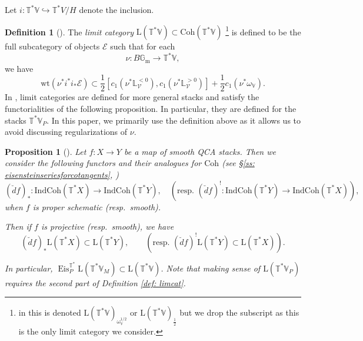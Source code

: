 \documentclass{amsart}
\newtheorem{proposition}[theorem]{Proposition}
\theoremstyle{definition}
\newtheorem{definition}[theorem]{Definition}
\theoremstyle{remark}
\numberwithin{equation}{section}
\newcommand{\mc}{\mathcal}
\newcommand{\Gm}{{\mathbb{G}_{\mathrm{m}}}}
\newcommand{\IndCoh}{\mathrm{IndCoh}}
\DeclareMathOperator{\Eis}{\mathrm{Eis}}
\newcommand{\Coh}{\mathrm{Coh}}
\newcommand{\V}{\mathbb{V}}
\newcommand{\T}{\mathbb{T}}
\renewcommand{\L}{\mathbb{L}}
\newcommand{\wt}{\mathrm{wt}}
\newcommand{\mrL}{\mathrm{L}}
\begin{document}
Let $i: \T^{\ast}\V \hookrightarrow \T^{\ast}V/H$ denote the inclusion.
\begin{definition}[{\cite[Lemma 3.7]{PTDolbeault}}]{\label{def: limcat}}
The \emph{limit category} $\mrL(\T^{\ast}\V) \subset \Coh(\T^{\ast}\V)$ \footnote{in \cite{PTDolbeault} this is denoted $\mrL(\T^{\ast}\V)_{\omega^{1/2}_{\V}}$ or $\mrL(\T^{\ast}\V)_{\frac{1}{2}}$ but we drop the subscript as this is the only limit category we consider.} is defined to be the full subcategory of objects $\mc{E}$ such that for each
\begin{equation*}
    \nu: B\Gm \rightarrow \T^{\ast}\V,
\end{equation*}
we have
\begin{equation*}
    \wt(\nu^{\ast}i^{\ast}i_{\ast}\mc{E}) \subset \frac{1}{2}[c_1(\nu^{\ast}\L^{<0}_{\mc{V}}), c_1(\nu^{\ast}\L^{>0}_{\mc{V}})] + \frac{1}{2}c_1(\nu^{\ast} \omega_{\V}).
\end{equation*}
In \cite[Definition 3.3]{PTDolbeault}, limit categories are defined for more general stacks and satisfy the functorialities of the following proposition. In particular, they are defined for the stacks $\T^{\ast}\V_P$. In this paper, we primarily use the definition above as it allows us to avoid discussing regularizations of $\nu$. 
\end{definition}
\begin{proposition}[{\cite[\S5.2, \S5.4]{PTDolbeault}}]{\label{prop: Limcatfunctorialities}}
Let $f: X \rightarrow Y$ be a map of smooth QCA stacks. Then we consider the following functors and their analogues for $\Coh$ (see \S \ref{ss: eisensteinseriesforcotangents}, \cite[Definition 2.1.23]{Chen2023categorical})
\begin{equation*}
    (\breve{d}f)_{\ast}: \IndCoh(\T^{\ast}X) \rightarrow \IndCoh(\T^{\ast}Y), \quad   \left(\text{resp.~}(\breve{d}f)^!: \IndCoh(\T^{\ast}Y) \rightarrow \IndCoh(\T^{\ast}X)\right),
\end{equation*}
when $f$ is proper schematic (resp.~smooth).

Then if $f$ is projective (resp.~smooth), we have
\begin{equation*}
(\breve{d}f)_{\ast}\mrL(\T^{\ast}X) \subset \mrL(\T^{\ast}Y), \qquad \left(\text{resp.~} (\breve{d}f)^{!}\mrL(\T^{\ast}Y) \subset \mrL(\T^{\ast}X)\right).
\end{equation*}

In particular, $\Eis^{\T^{\ast}}_P \mrL(\T^{\ast}\V_M) \subset \mrL(\T^{\ast}\V)$. Note that making sense of $\mrL(\T^{\ast}\V_P)$ requires the second part of Definition \ref{def: limcat}.    
\end{proposition}
\end{document}
